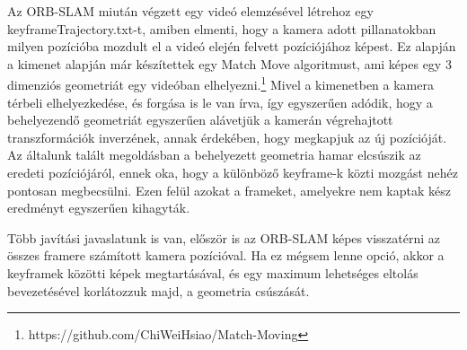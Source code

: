 Az ORB-SLAM miután végzett egy videó elemzésével létrehoz egy keyframeTrajectory.txt-t, amiben elmenti, hogy a kamera adott pillanatokban milyen pozícióba mozdult el a videó elején felvett pozíciójához képest.
Ez alapján a kimenet alapján már készítettek egy Match Move algoritmust, ami képes egy 3 dimenziós geometriát egy videóban elhelyezni.\footnote{https://github.com/ChiWeiHsiao/Match-Moving}
Mivel a kimenetben a kamera térbeli elhelyezkedése, és forgása is le van írva, így egyszerűen adódik, hogy a behelyezendő geometriát egyszerűen alávetjük a kamerán végrehajtott transzformációk inverzének, annak érdekében, hogy megkapjuk az új pozícióját.
Az általunk talált megoldásban a behelyezett geometria hamar elcsúszik az eredeti pozíciójáról, ennek oka, hogy a különböző keyframe-k közti mozgást nehéz pontosan megbecsülni.
Ezen felül azokat a frameket, amelyekre nem kaptak kész eredményt egyszerűen kihagyták.

Több javítási javaslatunk is van, először is az ORB-SLAM képes visszatérni az összes framere számított kamera pozícióval.
Ha ez mégsem lenne opció, akkor a keyframek közötti képek megtartásával, és egy maximum lehetséges eltolás bevezetésével korlátozzuk majd, a geometria csúszását.